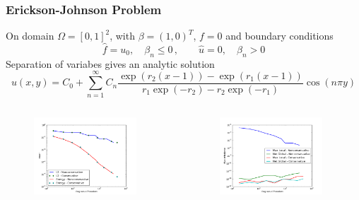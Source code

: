 \documentclass{beamer}
\begin{document}
\begin{frame}
\frametitle{Erickson-Johnson Problem}
On domain $\Omega=[0,1]^2$, with $\beta=(1,0)^T$, $f=0$ and boundary
conditions
\[
\hat f=u_0,\quad\beta_n\le0\,,\quad\quad\hat u=0,\quad\beta_n > 0
\]
Separation of variabes gives an analytic solution
\[
u(x,y)=C_0+\sum_{n=1}^\infty C_n
\frac{\exp(r_2(x-1))-\exp(r_1(x-1))}{r_1\exp(-r_2)-r_2\exp(-r_1)}
\cos(n\pi y)
\]
\vspace{-5ex}
\begin{columns}[b]
\begin{column}{0.5\textwidth}
\begin{figure}[t]
\centering
\includegraphics[width=0.9\textwidth]{Erickson/modifiedError.pdf}

\end{figure}
\end{column}
\begin{column}{0.5\textwidth}
\begin{figure}[t]
\centering
\includegraphics[width=0.9\textwidth]{Erickson/modifiedFlux.pdf}

\end{figure}
\end{column}
\end{columns}
\end{frame}

\end{document}
